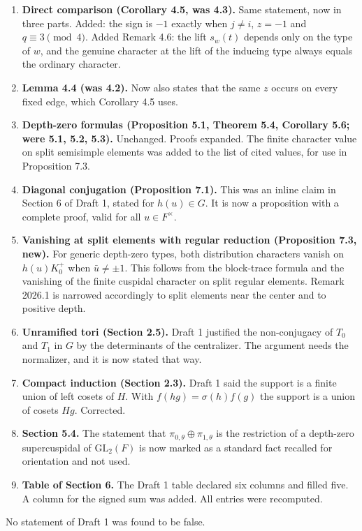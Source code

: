 \documentclass[12pt,letterpaper]{article}
\begin{document}
\begin{enumerate}
\item \textbf{Direct comparison (Corollary 4.5, was 4.3).} Same statement, now in three parts. Added: the sign is $-1$ exactly when $j\ne i$, $z=-1$ and $q\equiv3\pmod 4$. Added Remark 4.6: the lift $s_w(t)$ depends only on the type of $w$, and the genuine character at the lift of the inducing type always equals the ordinary character.
\item \textbf{Lemma 4.4 (was 4.2).} Now also states that the same $z$ occurs on every fixed edge, which Corollary 4.5 uses.
\item \textbf{Depth-zero formulas (Proposition 5.1, Theorem 5.4, Corollary 5.6; were 5.1, 5.2, 5.3).} Unchanged. Proofs expanded. The finite character value on split semisimple elements was added to the list of cited values, for use in Proposition 7.3.
\item \textbf{Diagonal conjugation (Proposition 7.1).} This was an inline claim in Section 6 of Draft 1, stated for $h(u)\in G$. It is now a proposition with a complete proof, valid for all $u\in F^\times$.
\item \textbf{Vanishing at split elements with regular reduction (Proposition 7.3, new).} For generic depth-zero types, both distribution characters vanish on $h(u)K_0^+$ when $\bar u\ne\pm1$. This follows from the block-trace formula and the vanishing of the finite cuspidal character on split regular elements. Remark 2026.1 is narrowed accordingly to split elements near the center and to positive depth.
\item \textbf{Unramified tori (Section 2.5).} Draft 1 justified the non-conjugacy of $T_0$ and $T_1$ in $G$ by the determinants of the centralizer. The argument needs the normalizer, and it is now stated that way.
\item \textbf{Compact induction (Section 2.3).} Draft 1 said the support is a finite union of left cosets of $H$. With $f(hg)=\sigma(h)f(g)$ the support is a union of cosets $Hg$. Corrected.
\item \textbf{Section 5.4.} The statement that $\pi_{0,\theta}\oplus\pi_{1,\theta}$ is the restriction of a depth-zero supercuspidal of $\mathrm{GL}_2(F)$ is now marked as a standard fact recalled for orientation and not used.
\item \textbf{Table of Section 6.} The Draft 1 table declared six columns and filled five. A column for the signed sum was added. All entries were recomputed.
\end{enumerate}
No statement of Draft 1 was found to be false.
\end{document}
